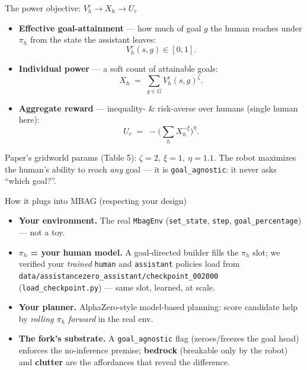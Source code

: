 \documentclass[aspectratio=169,10pt]{beamer}
\newcommand{\Veh}{V^{e}_{h}}
\begin{document}
\begin{frame}{The power objective: \texorpdfstring{$\Veh \to X_h \to U_r$}{Veh to Xh to Ur}}
  \begin{itemize}
    \item \textbf{Effective goal-attainment} --- how much of goal $g$ the human
      reaches under $\pi_h$ from the state the assistant leaves:
      \[ \Veh(s,g)\in[0,1]. \]
    \item \textbf{Individual power} --- a soft count of attainable goals:
      \[ X_h \;=\; \sum_{g\in G} \Veh(s,g)^{\zeta}. \]
    \item \textbf{Aggregate reward} --- inequality- \& risk-averse over humans
      (single human here):
      \[ U_r \;=\; -\Big(\textstyle\sum_h X_h^{-\xi}\Big)^{\eta}. \]
  \end{itemize}
  \vfill
  \footnotesize Paper's gridworld params (Table 5): $\zeta=2,\ \xi=1,\ \eta=1.1$.
  The robot maximizes the human's ability to reach \emph{any} goal --- it is
  \texttt{goal\_agnostic}: it never asks ``which goal?''.
\end{frame}

\begin{frame}{How it plugs into MBAG (respecting your design)}
  \begin{itemize}
    \item \textbf{Your environment.} The real \texttt{MbagEnv}
      (\texttt{set\_state}, \texttt{step}, \texttt{goal\_percentage}) --- not a toy.
    \item \textbf{$\pi_h$ = your human model.} A goal-directed builder fills the
      $\pi_h$ slot; we verified your \emph{trained} \texttt{human} and
      \texttt{assistant} policies load from\\
      \texttt{data/assistancezero\_assistant/checkpoint\_002000}
      (\texttt{load\_checkpoint.py}) --- same slot, learned, at scale.
    \item \textbf{Your planner.} AlphaZero-style model-based planning: score
      candidate help by \emph{rolling $\pi_h$ forward} in the real env.
    \item \textbf{The fork's substrate.} A \texttt{goal\_agnostic} flag
      (zeroes/freezes the goal head) enforces the no-inference premise;
      \textbf{bedrock} (breakable only by the robot) and \textbf{clutter} are the
      affordances that reveal the difference.
  \end{itemize}
\end{frame}
\end{document}
